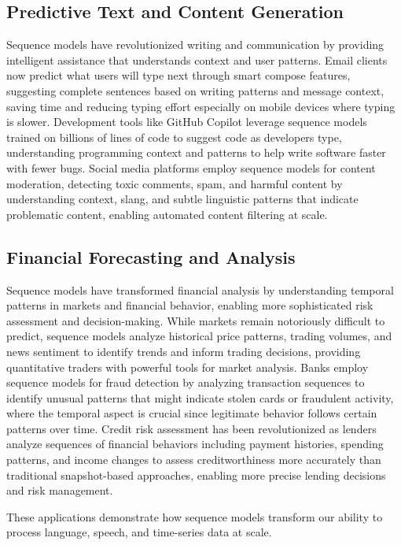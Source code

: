 \subsection{Predictive Text and Content Generation}

Sequence models have revolutionized writing and communication by providing intelligent assistance that understands context and user patterns. Email clients now predict what users will type next through smart compose features, suggesting complete sentences based on writing patterns and message context, saving time and reducing typing effort especially on mobile devices where typing is slower. Development tools like GitHub Copilot leverage sequence models trained on billions of lines of code to suggest code as developers type, understanding programming context and patterns to help write software faster with fewer bugs. Social media platforms employ sequence models for content moderation, detecting toxic comments, spam, and harmful content by understanding context, slang, and subtle linguistic patterns that indicate problematic content, enabling automated content filtering at scale.

\subsection{Financial Forecasting and Analysis}

Sequence models have transformed financial analysis by understanding temporal patterns in markets and financial behavior, enabling more sophisticated risk assessment and decision-making. While markets remain notoriously difficult to predict, sequence models analyze historical price patterns, trading volumes, and news sentiment to identify trends and inform trading decisions, providing quantitative traders with powerful tools for market analysis. Banks employ sequence models for fraud detection by analyzing transaction sequences to identify unusual patterns that might indicate stolen cards or fraudulent activity, where the temporal aspect is crucial since legitimate behavior follows certain patterns over time. Credit risk assessment has been revolutionized as lenders analyze sequences of financial behaviors including payment histories, spending patterns, and income changes to assess creditworthiness more accurately than traditional snapshot-based approaches, enabling more precise lending decisions and risk management.

These applications demonstrate how sequence models transform our ability to process language, speech, and time-series data at scale.

